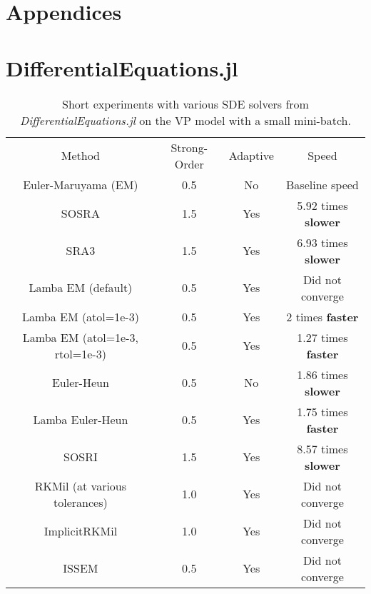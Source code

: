 \documentclass{article}
\begin{document}




\clearpage

\appendix
\section*{Appendices}

\section{DifferentialEquations.jl} \label{sec:old}

\begin{table}[!ht]
	\caption{Short experiments with various SDE solvers from {\em DifferentialEquations.jl} on the VP model with a small mini-batch.}
	\label{tab:tableold}
	\centering
	\begin{tabular}{cccc}
		\toprule
		Method & Strong-Order & Adaptive & Speed \\
		\cmidrule(){1-4}
		Euler-Maruyama (EM) & 0.5 & No & Baseline speed \\
		SOSRA \citep{rossler2010runge} & 1.5 & Yes & {\color{red}5.92 times \textbf{slower}} \\
		SRA3 \citep{rossler2010runge} & 1.5 & Yes & {\color{red}6.93 times \textbf{slower}} \\
		Lamba EM (default) \citep{lamba2003adaptive} & 0.5 & Yes &  Did not converge \\
		Lamba EM (atol=1e-3) \citep{lamba2003adaptive} & 0.5 & Yes  & {\color{ForestGreen}2 times \textbf{faster}} \\
		Lamba EM (atol=1e-3, rtol=1e-3) \citep{lamba2003adaptive} & 0.5 & Yes  & {\color{ForestGreen}1.27 times \textbf{faster}} \\
		Euler-Heun & 0.5 & No  & {\color{red}1.86 times \textbf{slower}} \\
		Lamba Euler-Heun \citep{lamba2003adaptive} & 0.5 & Yes &  {\color{ForestGreen}1.75 times \textbf{faster}} \\
		SOSRI \citep{rossler2010runge} & 1.5 & Yes &  {\color{red}8.57 times \textbf{slower}} \\
		RKMil (at various tolerances) \citep{kloeden1992stochastic} & 1.0 & Yes & Did not converge \\
		ImplicitRKMil \citep{kloeden1992stochastic} & 1.0 & Yes & Did not converge \\
		ISSEM & 0.5 & Yes & Did not converge \\
		\bottomrule
	\end{tabular}
\end{table}
\end{document}
